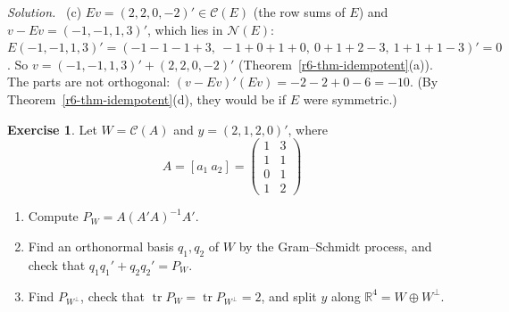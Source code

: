 \documentclass[12pt]{article}
\newcommand{\R}{\mathbb R}
\DeclareMathOperator{\tr}{tr}
\theoremstyle{definition}
\newtheorem{exercise}{Exercise}
\newenvironment{solution}{\par\noindent\textit{Solution.}\ }{\par\smallskip}
\begin{document}
\begin{solution}
(c) \(Ev=(2,2,0,-2)'\in\mathcal C(E)\) (the row sums of \(E\)) and \(v-Ev=(-1,-1,1,3)'\), which lies in \(\mathcal N(E)\):
\(E(-1,-1,1,3)'=(-1-1-1+3,\ -1+0+1+0,\ 0+1+2-3,\ 1+1+1-3)'=0\). So \(v=(-1,-1,1,3)'+(2,2,0,-2)'\)
(Theorem~\ref{r6-thm-idempotent}(a)). The parts are not orthogonal: \((v-Ev)'(Ev)=-2-2+0-6=-10\). (By
Theorem~\ref{r6-thm-idempotent}(d), they would be if \(E\) were symmetric.)
\end{solution}

\begin{exercise}\label{r6-dr-projection-matrix}
Let \(W=\mathcal C(A)\) and \(y=(2,1,2,0)'\), where
\[
A=[a_1\ a_2]=\begin{pmatrix}1&3\\1&1\\0&1\\1&2\end{pmatrix}
\]
\begin{enumerate}
\item Compute \(P_W=A(A'A)^{-1}A'\).
\item Find an orthonormal basis \(q_1,q_2\) of \(W\) by the Gram--Schmidt process, and check that
\(q_1q_1'+q_2q_2'=P_W\).
\item Find \(P_{W^\perp}\), check that \(\tr P_W=\tr P_{W^\perp}=2\), and split \(y\) along \(\R^4=W\oplus W^\perp\).
\end{enumerate}
\end{exercise}
\end{document}
